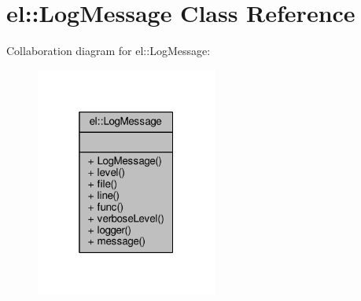 \hypertarget{classel_1_1LogMessage}{}\section{el\+:\+:Log\+Message Class Reference}
\label{classel_1_1LogMessage}


Collaboration diagram for el\+:\+:Log\+Message\+:
\nopagebreak
\begin{figure}[H]
\begin{center}
\leavevmode
\includegraphics[width=169pt]{d8/dbf/classel_1_1LogMessage__coll__graph}
\end{center}
\end{figure}
